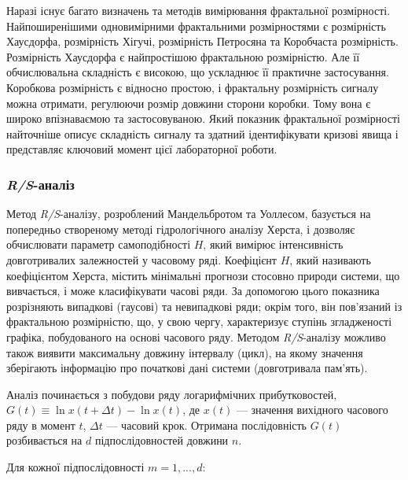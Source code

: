 \documentclass[
  letterpaper,
]{report}
\begin{document}
Наразі існує багато визначень та методів вимірювання фрактальної
розмірності. Найпоширенішими одновимірними фрактальними розмірностями є
розмірність Хаусдорфа, розмірність Хігучі, розмірність Петросяна та
Коробчаста розмірність. Розмірність Хаусдорфа є найпростішою фрактальною
розмірністю. Але її обчислювальна складність є високою, що ускладнює її
практичне застосування. Коробкова розмірність є відносно простою, і
фрактальну розмірність сигналу можна отримати, регулюючи розмір довжини
сторони коробки. Тому вона є широко впізнаваємою та застосовуваною. Який
показник фрактальної розмірності найточніше описує складність сигналу та
здатний ідентифікувати кризові явища і представляє ключовий момент цієї
лабораторної роботи.

\hypertarget{rs-ux430ux43dux430ux43bux456ux437}{%
\subsubsection{\texorpdfstring{\emph{R/S}-аналіз}{R/S-аналіз}}\label{rs-ux430ux43dux430ux43bux456ux437}}

Метод \emph{R/S}-аналізу, розроблений Мандельбротом та Уоллесом,
базується на попередньо створеному методі гідрологічного аналізу Херста,
і дозволяє обчислювати параметр самоподібності \(H\), який вимірює
інтенсивність довготривалих залежностей у часовому ряді. Коефіцієнт
\(H\), який називають коефіцієнтом Херста, містить мінімальні прогнози
стосовно природи системи, що вивчається, і може класифікувати часові
ряди. За допомогою цього показника розрізняють випадкові (гаусові) та
невипадкові ряди; окрім того, він пов'язаний із фрактальною розмірністю,
що, у свою чергу, характеризує ступінь згладженості графіка,
побудованого на основі часового ряду. Методом \emph{R/S}-аналізу можливо
також виявити максимальну довжину інтервалу (цикл), на якому значення
зберігають інформацію про початкові дані системи (довготривала пам'ять).

Аналіз починається з побудови ряду логарифмічних прибутковостей,
\(G(t) \equiv \ln{x(t + \Delta t)} - \ln{x(t)}\), де \(x(t)\) ---
значення вихідного часового ряду в момент \(t\), \(\Delta t\) ---
часовий крок. Отримана послідовність \(G(t)\) розбивається на \(d\)
підпослідовностей довжини \(n\).

Для кожної підпослідовності \(m=1,...,d\):
\end{document}
